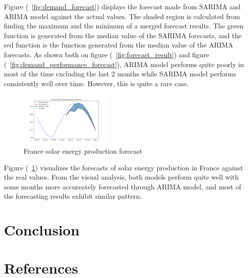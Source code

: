 \documentclass[acmtog]{acmart}
\begin{document}
Figure (~\ref{fig:demand_forecast}) displays the forecast made from SARIMA and ARIMA model against the actual values. The shaded region is calculated from finding the maximum and the minimum of a merged forecast results. The green function is generated from the median value of the SARIMA forecasts, and the red function is the function generated from the median value of the ARIMA forecasts. As shown both on figure (~\ref{fig:forecast_result}) and figure (~\ref{fig:demand_performance_forecast}), ARIMA model performs quite poorly in most of the time excluding the last 2 months while SARIMA model performs consistently well over time. However, this is quite a rare case. \\

\begin{figure}[htb!]
    \centering
    \includegraphics[width=0.4\textwidth]{figures/Figure_1.png}
    \caption{France solar energy production forecast}
    \label{fig:solar_forecast} %
\end{figure}

Figure (~\ref{fig:solar_forecast}) visualizes the forecasts of solar energy production in France against the real values. From the visual analysis, both models perform quite well with some months more accureately forecasted through ARIMA model, and most of the forecasting results exhibit similar pattern. \\



\section{Conclusion}

\section{References}
\end{document}
